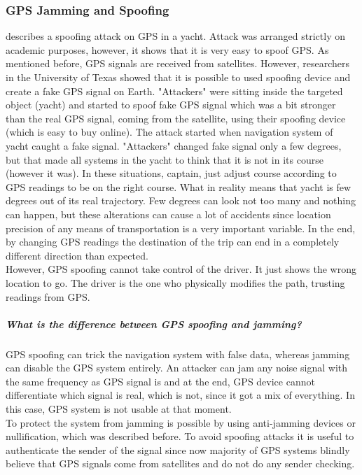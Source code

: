 \subsubsection{\gls{GPS} Jamming and Spoofing}

\cite{IIIspoof} describes a spoofing attack on \gls{GPS} in a yacht. Attack was arranged strictly on academic purposes, however, it shows that it is very easy to spoof \gls{GPS}. As mentioned before, \gls{GPS} signals are received from satellites. However, researchers in the University of Texas showed that it is possible to used spoofing device and create a fake \gls{GPS} signal on Earth.  "Attackers" were sitting inside the targeted object (yacht) and started to spoof fake \gls{GPS} signal which was a bit stronger than the real \gls{GPS} signal, coming from the satellite, using their spoofing device (which is easy to buy online). The attack started when navigation system of yacht caught a fake signal. "Attackers" changed fake signal only a few degrees, but that made all systems in the yacht to think that it is not in its course (however it was). In these situations, captain, just adjust course according to \gls{GPS} readings to be on the right course. What in reality means that yacht is few degrees out of its real trajectory. Few degrees can look not too many and nothing can happen, but these alterations can cause a lot of accidents since location precision of any means of transportation is a very important variable. In the end, by changing \gls{GPS} readings the destination of the trip can end in a completely different direction than expected.\\
However, \gls{GPS} spoofing cannot take control of the driver. It just shows the wrong location to go. The driver is the one who physically modifies the path, trusting readings from \gls{GPS}.
\subparagraph{What is the difference between \gls{GPS} spoofing and jamming?} \gls{GPS} spoofing can trick the navigation system with false data, whereas jamming can disable the \gls{GPS} system entirely. An attacker can jam any noise signal with the same frequency as \gls{GPS} signal is and at the end, \gls{GPS} device cannot differentiate which signal is real, which is not, since it got a mix of everything. In this case, \gls{GPS} system is not usable at that moment. \\
To protect the system from jamming is possible by using anti-jamming devices or nullification, which was described before. To avoid spoofing attacks it is useful to authenticate the sender of the signal since now majority of \gls{GPS} systems blindly believe that \gls{GPS} signals come from satellites and do not do any sender checking. \\ \\

